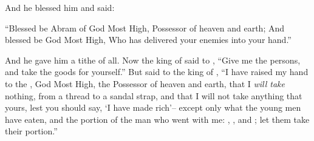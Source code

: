 \bverse And he blessed him and said:
\begin{bquotation}
``Blessed be Abram of God Most High, Possessor of heaven and earth; \bverse And blessed be God Most High, Who has delivered your enemies into your hand.''
\end{bquotation}
And he gave him a tithe of all.
\bverse Now the king of  said to , ``Give me the persons, and take the goods for yourself.''
\bverse But  said to the king of , ``I have raised my hand to the \lord, God Most High, the Possessor of heaven and earth,
\bverse that I \textit{will take} nothing, from a thread to a sandal strap, and that I will not take anything that \is yours, lest you should say, `I have made  rich'--
\bverse except only what the young men have eaten, and the portion of the man who went with me: , , and ; let them take their portion.''
